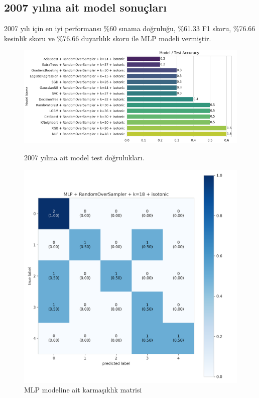 \subsection{2007 yılına ait model sonuçları}
2007 yılı için en iyi performansı \%60 sınama doğruluğu,  \%61.33 F1 skoru, \%76.66 kesinlik skoru ve \%76.66 duyarlılık skoru ile MLP modeli vermiştir.

\begin{figure}[ht]
\centering
\begin{minipage}[b]{0.6\textwidth}
    \centering
    \includegraphics[width=\textwidth]{2007.png}
    \caption{2007 yılına ait model test doğrulukları.}
    \label{fig:resim1}
\end{minipage}
\hfill
\begin{minipage}[b]{0.6\textwidth}
    \centering
    \includegraphics[width=\textwidth]{2007_cm.png}
    \caption{MLP modeline ait karmaşıklık matrisi}
    \label{fig:resim2}
\end{minipage}
\end{figure}
\newpage

